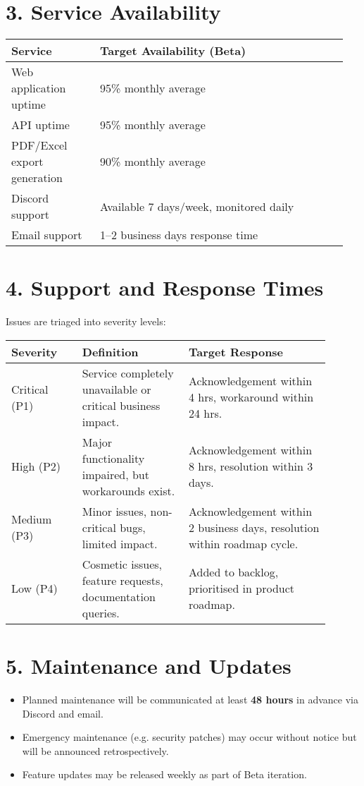 \documentclass[11pt,a4paper]{article}
\begin{document}
\section*{3. Service Availability}
\begin{longtable}{@{}p{0.25\linewidth}p{0.70\linewidth}@{}}
\toprule
\textbf{Service} & \textbf{Target Availability (Beta)} \\
\midrule
Web application uptime & 95\% monthly average \\
API uptime & 95\% monthly average \\
PDF/Excel export generation & 90\% monthly average \\
Discord support & Available 7 days/week, monitored daily \\
Email support & 1--2 business days response time \\
\bottomrule
\end{longtable}

\section*{4. Support and Response Times}
Issues are triaged into severity levels:

\begin{longtable}{@{}p{0.20\linewidth}p{0.30\linewidth}p{0.40\linewidth}@{}}
\toprule
\textbf{Severity} & \textbf{Definition} & \textbf{Target Response} \\
\midrule
Critical (P1) & Service completely unavailable or critical business impact. & Acknowledgement within 4 hrs, workaround within 24 hrs. \\
High (P2) & Major functionality impaired, but workarounds exist. & Acknowledgement within 8 hrs, resolution within 3 days. \\
Medium (P3) & Minor issues, non-critical bugs, limited impact. & Acknowledgement within 2 business days, resolution within roadmap cycle. \\
Low (P4) & Cosmetic issues, feature requests, documentation queries. & Added to backlog, prioritised in product roadmap. \\
\bottomrule
\end{longtable}

\section*{5. Maintenance and Updates}
\begin{itemize}[left=0pt]
  \item Planned maintenance will be communicated at least \textbf{48 hours} in advance via Discord and email.
  \item Emergency maintenance (e.g. security patches) may occur without notice but will be announced retrospectively.
  \item Feature updates may be released weekly as part of Beta iteration.
\end{itemize}
\end{document}
